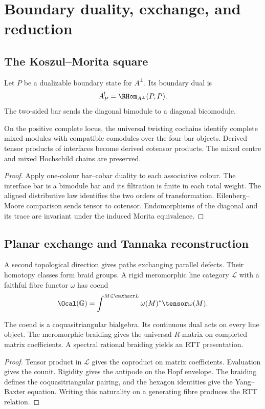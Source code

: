 \part{Boundary duality, exchange, and reduction}

\chapter{The Koszul--Morita square}
Let $P$ be a dualizable boundary state for $A^\perp$.  Its boundary dual is
\[
 A_P^!=\RHom_{A^\perp}(P,P).
\]
The two-sided bar sends the diagonal bimodule to a diagonal bicomodule.

\begin{theorem}
On the positive complete locus, the universal twisting cochains identify complete mixed modules with compatible comodules over the four bar objects.  Derived tensor products of interfaces become derived cotensor products.  The mixed centre and mixed Hochschild chains are preserved.
\end{theorem}
\begin{proof}
Apply one-colour bar--cobar duality to each associative colour.  The interface bar is a bimodule bar and its filtration is finite in each total weight.  The aligned distributive law identifies the two orders of transformation.  Eilenberg--Moore comparison sends tensor to cotensor.  Endomorphisms of the diagonal and its trace are invariant under the induced Morita equivalence.
\end{proof}

\chapter{Planar exchange and Tannaka reconstruction}
A second topological direction gives paths exchanging parallel defects.  Their homotopy classes form braid groups.  A rigid meromorphic line category $\mathscr L$ with a faithful fibre functor $\omega$ has coend
\[
 \Ocal(\mathbb G)=\int^{M\in\mathscr L}\omega(M)^*\tensor\omega(M).
\]

\begin{theorem}
The coend is a coquasitriangular bialgebra.  Its continuous dual acts on every line object.  The meromorphic braiding gives the universal $R$-matrix on completed matrix coefficients.  A spectral rational braiding yields an RTT presentation.
\end{theorem}
\begin{proof}
Tensor product in $\mathscr L$ gives the coproduct on matrix coefficients.  Evaluation gives the counit.  Rigidity gives the antipode on the Hopf envelope.  The braiding defines the coquasitriangular pairing, and the hexagon identities give the Yang--Baxter equation.  Writing this naturality on a generating fibre produces the RTT relation.
\end{proof}

